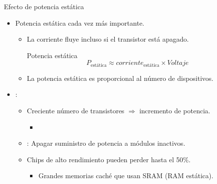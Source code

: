 \begin{frame}[t]{Efecto de potencia estática}
\begin{itemize}
  \item Potencia estática cada vez más importante.
    \begin{itemize}
      \item La corriente fluye incluso si el transistor está apagado.

\pause
\begin{block}{Potencia estática}
\begin{displaymath}
P_{\text{estática}} \approx corriente_{\text{estática}} \times Voltaje
\end{displaymath}
\end{block}

      \pause
      \item La potencia estática es proporcional al número de dispositivos.
    \end{itemize}

  \item {}:
    \begin{itemize}
      \item Creciente número de transistores $\Rightarrow$ incremento de potencia.
        \begin{itemize}
          \item {}
        \end{itemize}

      \pause
      \item {}: 
            Apagar suministro de potencia a módulos inactivos.            

      \pause
      \item Chips de alto rendimiento pueden perder hasta el 50\%.
        \begin{itemize}
          \item Grandes memorias caché que usan SRAM (RAM estática).
        \end{itemize}
    \end{itemize}
\end{itemize}
\end{frame}
